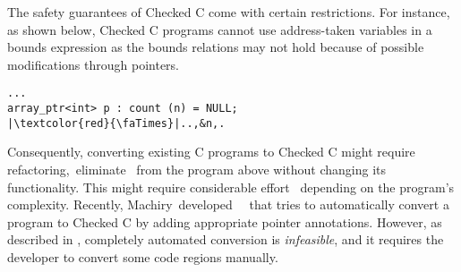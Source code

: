 %
The safety guarantees of Checked C come with certain restrictions. For instance,
as shown below, Checked C programs cannot use address-taken variables in a
bounds expression as the bounds relations may not hold because of possible
modifications through pointers.
% 
\begin{verbatim}
...
array_ptr<int> p : count (n) = NULL;
|\textcolor{red}{\faTimes}|..,&n,.
\end{verbatim}
% 
Consequently, converting existing C programs to Checked C might require
refactoring,~\eg eliminate~ from the program above without
changing its functionality.
% 
This might require considerable effort~\cite{duanrefactoring} depending on the
program's complexity.
% 
Recently, Machiry~\etal developed~\threec~\cite{machiry2022c} that tries to
automatically convert a program to Checked C by adding appropriate pointer
annotations.
However, as described in \threec, completely automated conversion
is \emph{infeasible}, and it requires the developer to convert some code regions
manually.  

